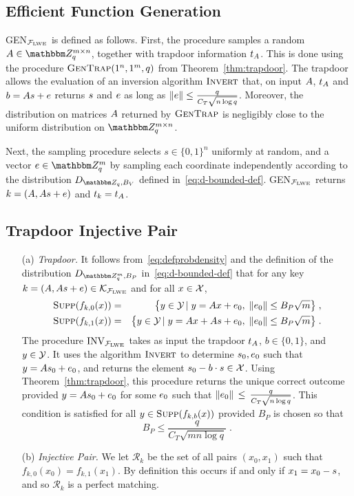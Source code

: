 \subsection{Efficient Function Generation}

GEN$_{\mathcal{F}_{\mathrm{LWE}}}$ is defined as follows. First, the procedure samples a random $\*A\in \mZ_q^{m\times n}$, together with trapdoor information $t_{\*A}$. This is done using the procedure $\textsc{GenTrap}(1^n,1^m,q)$ from Theorem~\ref{thm:trapdoor}. The trapdoor allows the evaluation of an inversion algorithm $\textsc{Invert}$  that, on input $\*A$, $t_{\*A}$ and $b=\*A\*s + \*e$ returns $\*s$ and $\*e$ as long as $\|\*e\|\leq \frac{q}{C_T\sqrt{n\log q}}$. Moreover, the distribution on matrices $\*A$ returned by $\textsc{GenTrap}$ is negligibly close to the uniform distribution on $\mZ_q^{m\times n}$.

Next, the sampling procedure selects $s\in \{0,1\}^n$ uniformly at random, and a vector $\*e\in \mZ_q^m$ by sampling each coordinate independently according to the distribution $D_{\mZ_q,B_V}$ defined in~\eqref{eq:d-bounded-def}. GEN$_{\mathcal{F}_{\mathrm{LWE}}}$ returns $k = (\*A,\*A\*s + \*e)$ and $t_k = t_{\*A}$. 


\subsection{Trapdoor Injective Pair}\label{sec:trapdoortwotoonereq}

\begin{enumerate}
\item[(a)] \textit{Trapdoor.} It follows from~\eqref{eq:defprobdensity} and the definition of the distribution $D_{\mZ_q^m,B_P}$ in~\eqref{eq:d-bounded-def} that for any key $k=(\*A,\*A\*s+\*e)\in \mathcal{K}_{\mathcal{F}_{\lwe}}$ and for all $x\in \mathcal{X}$,
\begin{eqnarray}
\supp(f_{k,0}(x)) &=& \big\{y \in \sY \,|\; y = \*Ax + \*e_0, \; \|\*e_0\|\leq B_P\sqrt{m}\big\}\;,\label{eq:supportofpdf0}\\
\supp(f_{k,1}(x)) &=& \big\{y \in \sY\,|\; y = \*Ax + \*A\*s + \*e_0, \;\|\*e_0\|\leq B_P\sqrt{m}\big\}\;.\label{eq:supportofpdf1}
\end{eqnarray}
The procedure $\textrm{INV}_{\mathcal{F}_{\mathrm{LWE}}}$ takes as input the trapdoor $t_{\*A}$, $b\in\{0,1\}$, and $y\in \mathcal{Y}$. It uses the algorithm $\textsc{Invert}$ to determine $\*s_0,\*e_0$ such that $y = \*A\*s_0+\*e_0$, and returns the element $\*s_0 - b \cdot\*s\in\sX$. Using Theorem~\ref{thm:trapdoor}, this procedure returns the unique correct outcome provided $y = \*A\*s_0+\*e_0$ for some $\*e_0$ such that $  \|\*e_0\|  \,\leq\, \frac{q}{C_T\sqrt{n\log q}}$. This condition is satisfied for all $y\in \textsc{Supp}(f_{k,b}(x))$ provided $B_P$ is chosen so that
\begin{equation}\label{eq:trapdoortwotoonerequirement}
		 B_P \leq \frac{q}{C_T\sqrt{mn\log q}}\;.
\end{equation}
\item[(b)] \textit{Injective Pair.} We let $\mathcal{R}_k$ be the set of all pairs $(x_0,x_1)$ such that $f_{k,0}(x_0) = f_{k,1}(x_1)$. By definition this occurs if and only if $x_1 = x_0 - \*s$, and so $\mathcal{R}_k$ is a perfect matching. 
\end{enumerate}


